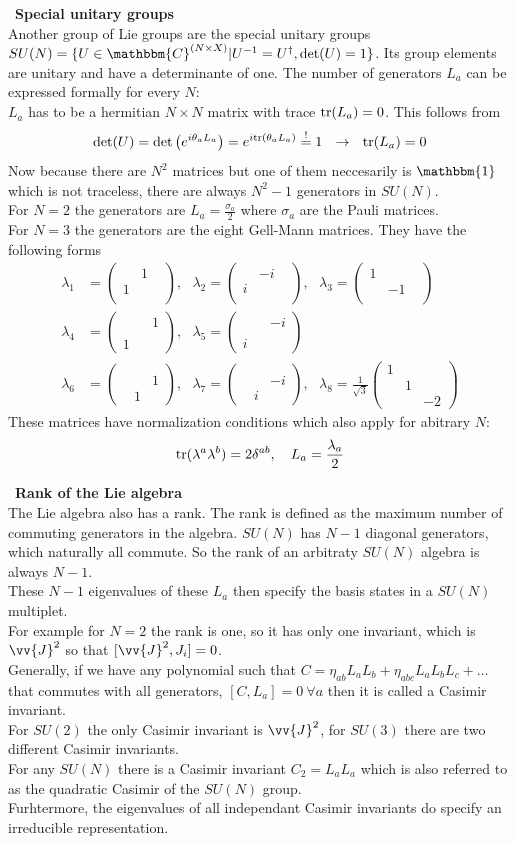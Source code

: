 \documentclass{include/thesisclass}
\newcommand{\df}{\rightarrow}
\newcommand{\ehm}{\mathbbm{1}}
\newcommand{\soll}{\overset{!}{=}}
\newcommand{\Mat}[9]{\begin{pmatrix}#1&#2&#3\\#4&#5&#6\\#7&#8&#9\end{pmatrix}}
\newcommand{\sub}[1]{~\newline\newline\textbf{#1}\\}
\newcommand{\tr}{{\rm tr}}
\begin{document}
\sub{Special unitary groups}
Another group of Lie groups are the special unitary groups $SU(N) = \{ U \in\mathbbm{C}^{(N\times X)} | U^{-1} = U^\dagger, \det(U) = 1\}$. Its group elements are unitary and have a determinante of one. The number of generators $L_a$ can be expressed formally for every $N$:\\
$L_a$ has to be a hermitian $N\times N$ matrix with trace $\tr(L_a) = 0$. This follows from
\[ \det(U) = \det \left( e^{i \theta_a L_a}\right) = e^{i \tr(\theta_a L_a)} \soll 1 ~~\df ~~ \tr(L_a) = 0\]
Now because there are $N^2$ matrices but one of them neccesarily is $\ehm$ which is not traceless, there are always $N^2-1$ generators in $SU(N)$.\\
For $N = 2$ the generators are $L_a = \frac{\sigma_a}{2}$ where $\sigma_a$ are the Pauli matrices.\\
For $N = 3$ the generators are the eight Gell-Mann matrices. They have the following forms
\begin{align*} \lambda_1 &= \Mat{}{1}{}{1}{}{}{}{}{},~~~\lambda_2 = \Mat{}{-i}{}{i}{}{}{}{}{},~~~\lambda_3 = \Mat{1}{}{}{}{-1}{}{}{}{}\\
\lambda_4 &= \Mat{}{}{1}{}{}{}{1}{}{}, ~~~\lambda_5 = \Mat{}{}{-i}{}{}{}{i}{}{}\\
\lambda_6 &= \Mat{}{}{}{}{}{1}{}{1}{}, ~~~\lambda_7 = \Mat{}{}{}{}{}{-i}{}{i}{}, ~~~\lambda_8 = \frac{1}{\sqrt{3}} \Mat{1}{}{}{}{1}{}{}{}{-2}
\end{align*}
These matrices have normalization conditions which also apply for abitrary $N$:
\[ \tr(\lambda^a \lambda^b) = 2\delta^{ab}, ~~~ L_a = \frac{\lambda_a}{2}\]


\sub{Rank of the Lie algebra}
The Lie algebra also has a rank. The rank is defined as the maximum number of commuting generators in the algebra. $SU(N)$ has $N-1$ diagonal generators, which naturally all commute. So the rank of an arbitraty $SU(N)$ algebra is always $N-1$.\\
These $N-1$ eigenvalues of these $L_a$ then specify the basis states in a $SU(N)$ multiplet.\\
For example for $N = 2$ the rank is one, so it has only one invariant, which is $\vv{J}^2$ so that $[\vv{J}^2, J_i] = 0$.\\
Generally, if we have any polynomial such that $C = \eta_{ab} L_a L_b + \eta_{abc} L_aL_bL_c + \ldots$ that commutes with all generators, $[C,L_a] = 0 ~\forall a$ then it is called a Casimir invariant.\\
For $SU(2)$ the only Casimir invariant is $\vv{J}^2$, for $SU(3)$ there are two different Casimir invariants.\\
For any $SU(N)$ there is a Casimir invariant $C_2 = L_aL_a$ which is also referred to as the quadratic Casimir of the $SU(N)$ group.\\
Furhtermore, the eigenvalues of all independant Casimir invariants do specify an irreducible representation.
\end{document}
